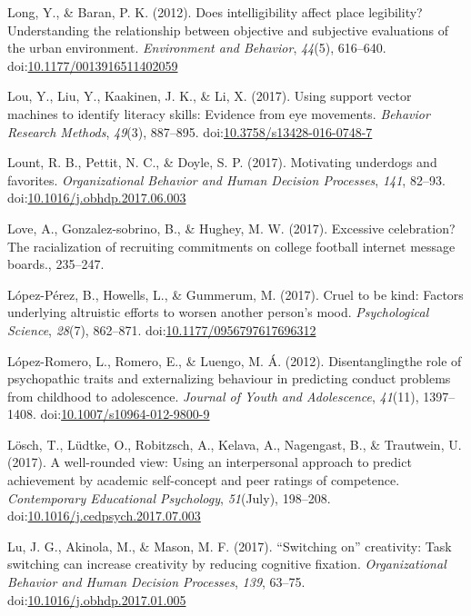 \documentclass[english,man]{apa6}
\theoremstyle{definition}
\theoremstyle{definition}
\theoremstyle{definition}
\theoremstyle{remark}
\begin{document}
\hypertarget{ref-Long2012}{}
Long, Y., \& Baran, P. K. (2012). Does intelligibility affect place
legibility? Understanding the relationship between objective and
subjective evaluations of the urban environment. \emph{Environment and
Behavior}, \emph{44}(5), 616--640.
doi:\href{https://doi.org/10.1177/0013916511402059}{10.1177/0013916511402059}

\hypertarget{ref-Lou2017}{}
Lou, Y., Liu, Y., Kaakinen, J. K., \& Li, X. (2017). Using support
vector machines to identify literacy skills: Evidence from eye
movements. \emph{Behavior Research Methods}, \emph{49}(3), 887--895.
doi:\href{https://doi.org/10.3758/s13428-016-0748-7}{10.3758/s13428-016-0748-7}

\hypertarget{ref-Lount2017}{}
Lount, R. B., Pettit, N. C., \& Doyle, S. P. (2017). Motivating
underdogs and favorites. \emph{Organizational Behavior and Human
Decision Processes}, \emph{141}, 82--93.
doi:\href{https://doi.org/10.1016/j.obhdp.2017.06.003}{10.1016/j.obhdp.2017.06.003}

\hypertarget{ref-Love2017}{}
Love, A., Gonzalez-sobrino, B., \& Hughey, M. W. (2017). Excessive
celebration? The racialization of recruiting commitments on college
football internet message boards., 235--247.

\hypertarget{ref-Lopez-Perez2017}{}
López-Pérez, B., Howells, L., \& Gummerum, M. (2017). Cruel to be kind:
Factors underlying altruistic efforts to worsen another person's mood.
\emph{Psychological Science}, \emph{28}(7), 862--871.
doi:\href{https://doi.org/10.1177/0956797617696312}{10.1177/0956797617696312}

\hypertarget{ref-Lopez-Romero2012}{}
López-Romero, L., Romero, E., \& Luengo, M. Á. (2012). Disentanglingthe
role of psychopathic traits and externalizing behaviour in predicting
conduct problems from childhood to adolescence. \emph{Journal of Youth
and Adolescence}, \emph{41}(11), 1397--1408.
doi:\href{https://doi.org/10.1007/s10964-012-9800-9}{10.1007/s10964-012-9800-9}

\hypertarget{ref-Losch2017}{}
Lösch, T., Lüdtke, O., Robitzsch, A., Kelava, A., Nagengast, B., \&
Trautwein, U. (2017). A well-rounded view: Using an interpersonal
approach to predict achievement by academic self-concept and peer
ratings of competence. \emph{Contemporary Educational Psychology},
\emph{51}(July), 198--208.
doi:\href{https://doi.org/10.1016/j.cedpsych.2017.07.003}{10.1016/j.cedpsych.2017.07.003}

\hypertarget{ref-Lu2017}{}
Lu, J. G., Akinola, M., \& Mason, M. F. (2017). ``Switching on''
creativity: Task switching can increase creativity by reducing cognitive
fixation. \emph{Organizational Behavior and Human Decision Processes},
\emph{139}, 63--75.
doi:\href{https://doi.org/10.1016/j.obhdp.2017.01.005}{10.1016/j.obhdp.2017.01.005}
\end{document}
